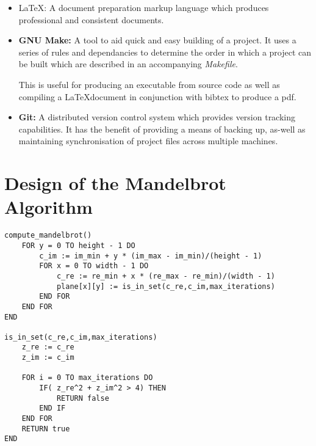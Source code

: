 \begin{itemize}
\item         \LaTeX:    A document preparation markup language which produces professional and consistent 
                         documents. 

\item \textbf{GNU Make:} A tool to aid quick and easy building of a project. It uses a series of 
                         rules and dependancies to determine the order in which a project can be built 
                         which are described in an accompanying \textit{Makefile}. 
                         
                         This is useful for  producing an executable from source code as well
                         as compiling a \LaTeX  document in conjunction with bibtex to produce a pdf.

\item \textbf{Git:}      A distributed version control system which provides version tracking capabilities. 
                         It has the benefit of providing a means of backing up, as-well as maintaining 
                         synchronisation of project files across multiple machines.
\end{itemize}

\section{Design of the Mandelbrot Algorithm}

\begin{lstlisting}[label = li:mandelalgo, caption = A sequential algorithm to compute the Mandelbrot Set presented in pseudo code.]
compute_mandelbrot()
    FOR y = 0 TO height - 1 DO
        c_im := im_min + y * (im_max - im_min)/(height - 1)
        FOR x = 0 TO width - 1 DO
            c_re := re_min + x * (re_max - re_min)/(width - 1)
            plane[x][y] := is_in_set(c_re,c_im,max_iterations)
        END FOR
    END FOR
END

is_in_set(c_re,c_im,max_iterations)
    z_re := c_re
    z_im := c_im

    FOR i = 0 TO max_iterations DO
        IF( z_re^2 + z_im^2 > 4) THEN
            RETURN false
        END IF
    END FOR
    RETURN true 
END

\end{lstlisting}

